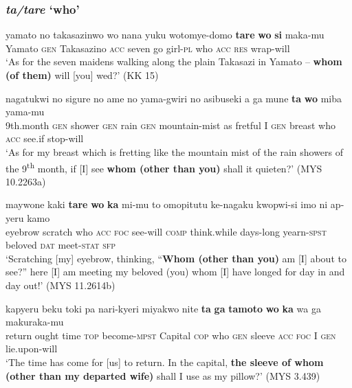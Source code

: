 \documentclass[output=paper]{LSP/langsci}
\begin{document}
\largerpage[2]
\subsubsection{\textit{ta/tare} ‘who’}
\label{07-subsubsec:2-2-2}

\begin{exe}
\ex%
\label{07-fr-ex:15}
\gll yamato no takasazinwo wo nana yuku wotomye-domo \textbf{tare} \textbf{wo} \textbf{si} maka-mu\\
Yamato \textsc{gen} Takasazino \textsc{acc} seven go girl-\textsc{pl}  who   \textsc{acc}  \textsc{res} wrap-will\\
\glt ‘As for the seven maidens walking along the plain Takasazi in Yamato -- \textbf{whom (of them)} will [you] wed?’  (KK 15)
\end{exe}

\begin{exe}
\ex%
\label{07-fr-ex:16}
\gll nagatukwi no sigure no ame no yama-gwiri no asibuseki a ga mune \textbf{ta} \textbf{wo} miba yama-mu\\
9th.month \textsc{gen} shower \textsc{gen} rain \textsc{gen} mountain-mist as fretful I \textsc{gen} breast who \textsc{acc} see.if stop-will\\
\glt ‘As for my breast which is fretting like the mountain mist of the rain showers of the 9\textsuperscript{th} month, if [I] see \textbf{whom (other than you)} shall it quieten?’  (MYS 10.2263a)
\end{exe}

\begin{exe}
\ex%
\label{07-fr-ex:17}
\gll maywone kaki \textbf{tare} \textbf{wo} \textbf{ka} mi-mu to omopitutu ke-nagaku kwopwi-si imo ni ap-yeru kamo\\
eyebrow scratch who \textsc{acc}  \textsc{foc}  see-will \textsc{comp} think.while days-long yearn-\textsc{spst} beloved \textsc{dat} meet-\textsc{stat} \textsc{sfp}\\
\glt ‘Scratching [my] eyebrow, thinking, “\textbf{Whom (other than you)} am [I] about to see?” here [I] am meeting my beloved (\ie you) whom [I] have longed for day in and day out!’  (MYS 11.2614b)\\
\end{exe}

\begin{exe}
\ex%
\label{07-fr-ex:18}
\gll kapyeru beku toki pa nari-kyeri miyakwo nite \textbf{ta} \textbf{ga} \textbf{tamoto} \textbf{wo} \textbf{ka} wa ga makuraka-mu\\
return ought time \textsc{top} become-\textsc{mpst} Capital \textsc{cop}  who \textsc{gen} sleeve \textsc{acc} \textsc{foc} I \textsc{gen} lie.upon-will\\
\glt ‘The time has come for [us] to return. In the capital, \textbf{the sleeve of whom (other than my departed wife)} shall I use as my pillow?’   (MYS 3.439)\\
\end{exe}
\end{document}
